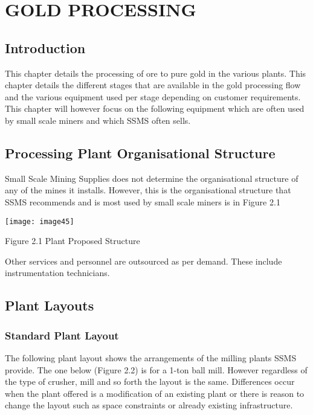 \chapter{ GOLD PROCESSING}


\section{  Introduction}

\noindent This chapter details the processing of ore to pure gold in the various plants. This chapter details the different stages that are available in the gold processing flow and the various equipment used per stage depending on customer requirements. This chapter will however focus on the following equipment which are often used by small scale miners and which SSMS often sells. \par


\section{ Processing Plant Organisational Structure}

\noindent Small Scale Mining Supplies does not determine the organisational structure of any of the mines it installs. However, this is the organisational structure that SSMS recommends and is most used by small scale miners is in Figure 2.1\par

\noindent \texttt{[image: image45]}

\noindent Figure 2.1 Plant Proposed Structure

\noindent Other services and personnel are outsourced as per demand. These include instrumentation technicians.


\section{ Plant Layouts}


\subsection{ Standard Plant Layout }

\noindent The following plant layout shows the arrangements of the milling plants SSMS provide. The one below (Figure 2.2) is for a 1-ton ball mill. However regardless of the type of crusher, mill and so forth the layout is the same. Differences occur when the plant offered is a modification of an existing plant or there is reason to change the layout such as space constraints or already existing infrastructure. \par

